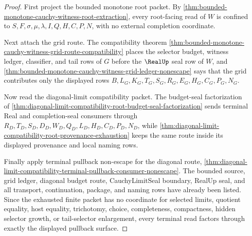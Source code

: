\begin{proof}
First project the bounded monotone root packet. By \autoref{thm:bounded-monotone-cauchy-witness-root-extraction}, every root-facing read of $W$ is confined to $S,F,\sigma,\mu,\lambda,I,Q,H,C,P,N$, with no external completion coordinate.

Next attach the grid route. The compatibility theorem \autoref{thm:bounded-monotone-cauchy-witness-grid-route-compatibility} places the selector budget, witness ledger, classifier, and tail rows of $G$ before the $\RealUp$ seal row of $W$, and \autoref{thm:bounded-monotone-cauchy-witness-grid-ledger-nonescape} says that the grid contributes only the displayed rows $B,L_G,K_G,T_G,S_G,R_G,E_G,H_G,C_G,P_G,N_G$.

Now read the diagonal-limit compatibility packet. The budget-seal factorization of \autoref{thm:diagonal-limit-compatibility-root-budget-seal-factorization} sends terminal Real and completion-seal consumers through $R_D,T_D,S_D,D_D,W_D,Q_D,L_D,H_D,C_D,P_D,N_D$, while \autoref{thm:diagonal-limit-compatibility-root-provenance-exhaustion} keeps the same route inside its displayed provenance and local naming rows.

Finally apply terminal pullback non-escape for the diagonal route, \autoref{thm:diagonal-limit-compatibility-terminal-pullback-consumer-nonescape}. The bounded source, grid ledger, diagonal budget route, CauchyLimitSeal boundary, RealUp seal, and all transport, continuation, package, and naming rows have already been listed. Since the exhausted finite packet has no coordinate for selected limits, quotient equality, host equality, trichotomy, choice, completeness, compactness, hidden selector growth, or tail-selector enlargement, every terminal read factors through exactly the displayed pullback surface.
\end{proof}


